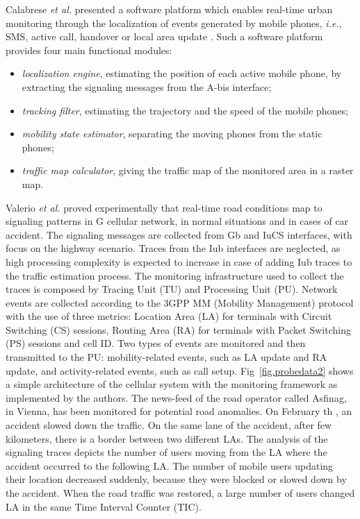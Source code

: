 \documentclass[10pt,onecolumn]{article}
\begin{document}
Calabrese \textit{et al.} presented a software platform which enables real-time urban monitoring through the localization of events generated by mobile phones, \textit{i.e.}, SMS, active call, handover or local area update \cite{Calabrese2011}. Such a software platform provides four main functional modules: 
\begin{itemize}
\item \textit{localization engine}, estimating the position of each active mobile phone, by extracting the signaling messages from the A-bis interface;
\item \textit{tracking filter}, estimating the trajectory and the speed of the mobile phones; 
\item \textit{mobility state estimator}, separating the moving phones from the static phones; 
\item \textit{traffic map calculator}, giving the traffic map of the monitored area in a raster map.
\end{itemize}

Valerio \textit{et al.} \cite{Valerio2009} proved experimentally that real-time road conditions map to signaling patterns in G cellular network, in normal situations and in cases of car accident. 
The signaling messages are collected from Gb and IuCS interfaces, with focus on the highway scenario. 
Traces from the Iub interfaces are neglected, as high processing complexity is expected to increase in case of adding Iub traces to the traffic estimation process. 
The monitoring infrastructure used to collect the traces is composed by Tracing Unit (TU) and Processing Unit (PU). 
Network events are collected according to the 3GPP MM (Mobility Management) protocol with the use of three metrics: Location Area (LA) for terminals with Circuit Switching (CS) sessions, Routing Area (RA) for terminals with Packet Switching (PS) sessions and cell ID. Two types of events are monitored and then transmitted to the PU:
mobility-related events, such as LA update and RA update, and activity-related events, such as call setup. Fig~\ref{fig.probedata2} shows a simple architecture of the cellular system with the monitoring framework as implemented by the authors.
The news-feed of the road operator called Asfinag, in Vienna, has been monitored for potential road anomalies. On February th , an accident slowed down the traffic. On the same lane of the accident, after few kilometers, there is a border between two different LAs. The analysis of the signaling traces depicts the number of users moving from the LA where the accident occurred to the following LA. The number of mobile users updating their location decreased suddenly, because they were blocked or slowed down by the accident. When the road traffic was restored, a large number of users changed LA in the same Time Interval Counter (TIC). 
\end{document}
